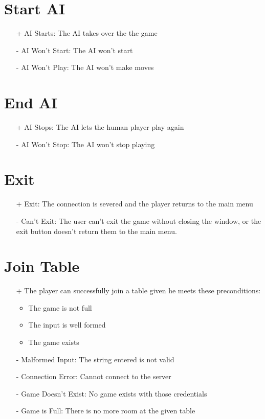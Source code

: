 \documentclass[12pt]{article}
\begin{document}
\section{Start AI}

\begin{itemize}
\item[+] AI Starts: The AI takes over the the game
\item[-] AI Won't Start: The AI won't start
\item[-] AI Won't Play: The AI won't make moves

\end{itemize}

\section{End AI}

\begin{itemize}
\item[+] AI Stops: The AI lets the human player play again
\item[-] AI Won't Stop: The AI won't stop playing
\end{itemize}

\section{Exit}
\begin{itemize}


\item[+] Exit: The connection is severed and the player returns to the main menu
\item[-] Can't Exit: The user can't exit the game without closing the window, or the
exit button doesn't return them to the main menu.
\end{itemize}
\section{Join Table}
\begin{itemize}
\item[+] The player can successfully join a table given he meets these preconditions:
\begin{itemize}
\item The game is not full
\item The input is well formed
\item The game exists
\end{itemize}
\item[-] Malformed Input: The string entered is not valid
\item[-] Connection Error: Cannot connect to the server
\item[-] Game Doesn't Exist: No game exists with those credentials
\item[-] Game is Full: There is no more room at the given table
\end{itemize}
\end{document}
